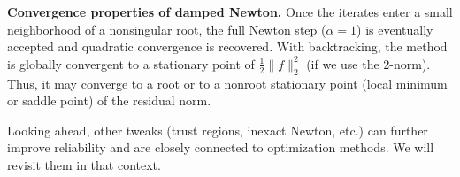
\textbf{Convergence properties of damped Newton.}
Once the iterates enter a small neighborhood of a nonsingular root, the full Newton step ($\alpha=1$) is eventually accepted and quadratic convergence is recovered. With backtracking, the method is globally convergent to a stationary point of $\tfrac12\|f\|_2^2$ (if we use the 2-norm). Thus, it may converge to a root or to a nonroot stationary point (local minimum or saddle point) of the residual norm.

Looking ahead, other tweaks (trust regions, inexact Newton, etc.) can further improve reliability and are closely connected to optimization methods. We will revisit them in that context.


